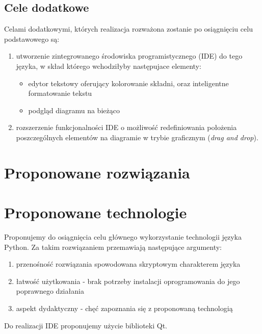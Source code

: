 ﻿\documentclass[a4paper,11pt,notitlepage]{article}
\begin{document}
\subsection{Cele dodatkowe}
Celami dodatkowymi, których realizacja rozważona zostanie po osiągnięciu celu podstawowego są:
\begin{enumerate}
  \item{
    utworzenie zintegrowanego środowiska programistycznego (IDE) do tego języka, w skład którego wchodziłyby następujace elementy:
    \begin{itemize}
      \item{edytor tekstowy oferujący kolorowanie składni, oraz inteligentne formatowanie tekstu}
      \item{podgląd diagramu na bieżąco}
    \end{itemize}
  }
  \item{rozszerzenie funkcjonalności IDE o możliwość redefiniowania położenia poszczególnych elementów na diagramie w trybie graficznym (\emph{drag and drop}).}
\end{enumerate}
\section{Proponowane rozwiązania}
\section{Proponowane technologie}
Proponujemy do osiągnięcia celu głównego wykorzystanie technologii języka Python. Za takim rozwiązaniem przemawiają następujące argumenty:
\begin{enumerate}
  \item{przenośność rozwiązania spowodowana skryptowym charakterem języka}
  \item{łatwość użytkowania - brak potrzeby instalacji oprogramowania do jego poprawnego działania}
  \item{aspekt dydaktyczny - chęć zapoznania się z proponowaną technologią}
\end{enumerate}
Do realizacji IDE proponujemy użycie biblioteki Qt.
\end{document}

